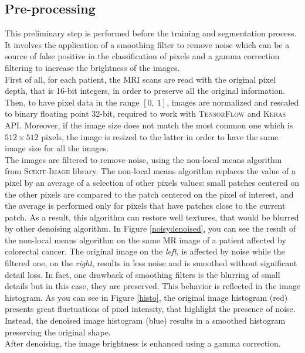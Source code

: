 \documentclass{standalone}
\begin{document}
\subsection{Pre-processing}

This preliminary step is performed before the training and segmentation process.
It involves the application of a smoothing filter to remove noise which can be a source of false positive in the classification of pixels and a gamma correction filtering to increase the brightness of the images.\\
First of all, for each patient, the MRI scans are read with the original pixel depth, that is 16-bit integers, in order to preserve all the original information.
Then, to have pixel data in the range $ [ 0, \: 1 ] $, images are normalized and rescaled to binary floating point 32-bit, required to work with \textsc{TensorFlow}\cite{Tensorflow} and \textsc{Keras} API\cite{Keras}.
Moreover, if the image size does not match the most common one which is $512 \times 512$ pixels, the image is resized to the latter in order to have the same image size for all the images. 
\\
The images are filtered to remove noise, using the non-local means algorithm from \textsc{Scikit-Image}\cite{scikit-image} library.
The non-local means algorithm replaces the value of a pixel by an average of a selection of other pixels values: 
small patches centered on the other pixels are compared to the patch centered on the pixel of interest, and the average is performed only for pixels that have patches close to the current patch. 
As a result, this algorithm can restore well textures, that would be blurred by other denoising algorithm\cite{scikit-image}.
In Figure \ref{noisydenoised}, you can see the result of the non-local means algorithm on the same MR image of a patient affected by colorectal cancer.
The original image on the \textit{left}, is affected by noise while the filtered one, on the \textit{right}, results in less noise and is smoothed without significant detail loss. 
In fact, one drawback of smoothing filters is the blurring of small details but in this case, they are preserved.
This behavior is reflected in the image histogram. 
As you can see in Figure \ref{histo}, the original image histogram (red) presents great fluctuations of pixel intensity, that highlight the presence of noise. 
Instead, the denoised image histogram (blue) results in a smoothed histogram preserving the original shape.
\\
After denoising, the image brightness is enhanced using a gamma correction.
\end{document}
